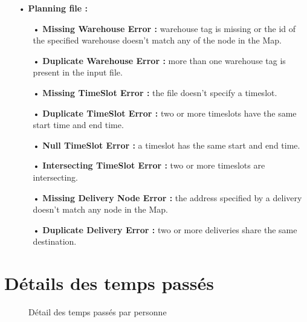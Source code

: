 \documentclass[paper=a4, fontsize=11pt]{report}
\numberwithin{equation}{section}		%
\numberwithin{figure}{section}		%
\numberwithin{table}{section}		%
\begin{document}
\begin{itemize}
\begin{itemize}
    \item[•] \textbf{Planning file :}
    \begin{itemize}
      \item[•] \textbf{Missing Warehouse Error :} warehouse tag is missing or the id of the specified warehouse doesn’t match any of the node in the Map.
      \item[•] \textbf{Duplicate Warehouse Error :} more than one warehouse tag is present in the input file.
      \item[•] \textbf{Missing TimeSlot Error :} the file doesn’t specify a timeslot.
      \item[•] \textbf{Duplicate TimeSlot Error :} two or more timeslots have the same start time and end time.
      \item[•] \textbf{Null TimeSlot Error :} a timeslot has the same start and end time.
      \item[•] \textbf{Intersecting TimeSlot Error :} two or more timeslots are intersecting.
      \item[•] \textbf{Missing Delivery Node Error :} the address specified by a delivery doesn’t match any node in the Map.
      \item[•] \textbf{Duplicate Delivery Error :} two or more deliveries share the same destination. 
    \end{itemize}
  \end{itemize}
\end{itemize}


\label{sec:cr-des-taches-redmine}


\section{Détails des temps passés}
\label{sec:details-des-temps-passes}

\begin{figure}[H]
\centering
\noindent{}
\caption{Détail des temps passés par personne}
\end{figure}

\end{document}
